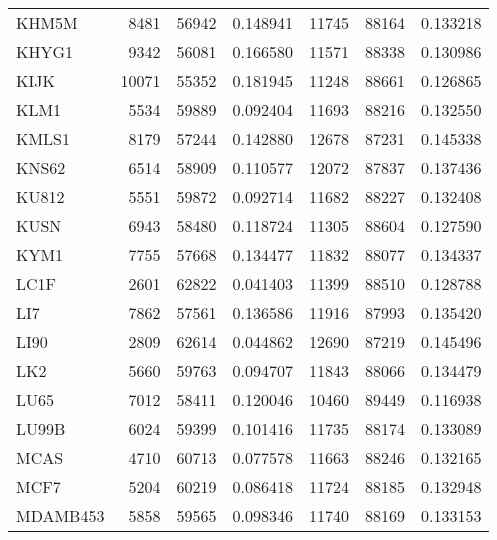 \begin{tabular}{lrrrrrr}
                                KHM5M &      8481 &    56942 &  0.148941 &     11745 &    88164 &  0.133218 \\
                                KHYG1 &      9342 &    56081 &  0.166580 &     11571 &    88338 &  0.130986 \\
                                 KIJK &     10071 &    55352 &  0.181945 &     11248 &    88661 &  0.126865 \\
                                 KLM1 &      5534 &    59889 &  0.092404 &     11693 &    88216 &  0.132550 \\
                                KMLS1 &      8179 &    57244 &  0.142880 &     12678 &    87231 &  0.145338 \\
                                KNS62 &      6514 &    58909 &  0.110577 &     12072 &    87837 &  0.137436 \\
                                KU812 &      5551 &    59872 &  0.092714 &     11682 &    88227 &  0.132408 \\
                                 KUSN &      6943 &    58480 &  0.118724 &     11305 &    88604 &  0.127590 \\
                                 KYM1 &      7755 &    57668 &  0.134477 &     11832 &    88077 &  0.134337 \\
                                 LC1F &      2601 &    62822 &  0.041403 &     11399 &    88510 &  0.128788 \\
                                  LI7 &      7862 &    57561 &  0.136586 &     11916 &    87993 &  0.135420 \\
                                 LI90 &      2809 &    62614 &  0.044862 &     12690 &    87219 &  0.145496 \\
                                  LK2 &      5660 &    59763 &  0.094707 &     11843 &    88066 &  0.134479 \\
                                 LU65 &      7012 &    58411 &  0.120046 &     10460 &    89449 &  0.116938 \\
                                LU99B &      6024 &    59399 &  0.101416 &     11735 &    88174 &  0.133089 \\
                                 MCAS &      4710 &    60713 &  0.077578 &     11663 &    88246 &  0.132165 \\
                                 MCF7 &      5204 &    60219 &  0.086418 &     11724 &    88185 &  0.132948 \\
                             MDAMB453 &      5858 &    59565 &  0.098346 &     11740 &    88169 &  0.133153 \\

\end{tabular}

